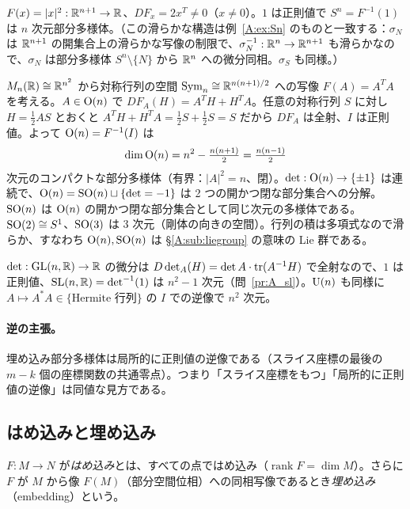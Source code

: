 \begin{ex}[球面]
$F(x)=|x|^2:\mathbb R^{n+1}\to\mathbb R$、$DF_x=2x^T\ne0$（$x\ne0$）。$1$ は正則値で $S^n=F^{-1}(1)$ は $n$ 次元部分多様体。（この滑らかな構造は例~\ref{A:ex:Sn} のものと一致する：$\sigma_N$ は $\mathbb R^{n+1}$ の開集合上の滑らかな写像の制限で、$\sigma_N^{-1}:\mathbb R^n\to\mathbb R^{n+1}$ も滑らかなので、$\sigma_N$ は部分多様体 $S^n\setminus\{N\}$ から $\mathbb R^n$ への微分同相。$\sigma_S$ も同様。）
\end{ex}

\begin{ex}[$\OO(n)$、$\SO(n)$]\label{A:ex:SOn}
$M_n(\mathbb R)\cong\mathbb R^{n^2}$ から対称行列の空間 $\mathrm{Sym}_n\cong\mathbb R^{n(n+1)/2}$ への写像 $F(A)=A^TA$ を考える。$A\in\mathrm{O}(n)$ で $DF_A(H)=A^TH+H^TA$。任意の対称行列 $S$ に対し $H=\frac12AS$ とおくと $A^TH+H^TA=\frac12S+\frac12S=S$ だから $DF_A$ は全射、$I$ は正則値。よって $\mathrm{O}(n)=F^{-1}(I)$ は
\[
\dim\mathrm{O}(n)=n^2-\tfrac{n(n+1)}2=\tfrac{n(n-1)}2
\]
次元のコンパクトな部分多様体（有界：$|A|^2=n$、閉）。$\det:\mathrm{O}(n)\to\{\pm1\}$ は連続で、$\mathrm{O}(n)=\mathrm{SO}(n)\sqcup\{\det=-1\}$ は 2 つの開かつ閉な部分集合への分解。$\SO(n)$ は $\OO(n)$ の開かつ閉な部分集合として同じ次元の多様体である。$\mathrm{SO}(2)\cong S^1$、$\mathrm{SO}(3)$ は 3 次元（剛体の向きの空間）。行列の積は多項式なので滑らか、すなわち $\mathrm{O}(n),\mathrm{SO}(n)$ は §\ref{A:sub:liegroup} の意味の Lie 群である。
\end{ex}

\begin{ex}[$\SL(n,\R)$ ほか]
$\det:\mathrm{GL}(n,\mathbb R)\to\mathbb R$ の微分は $D\det_A(H)=\det A\cdot\operatorname{tr}(A^{-1}H)$ で全射なので、$1$ は正則値、$\mathrm{SL}(n,\mathbb R)=\det^{-1}(1)$ は $n^2-1$ 次元（問~\ref{pr:A_sl}）。$\mathrm{U}(n)$ も同様に $A\mapsto A^*A\in\{\text{Hermite 行列}\}$ の $I$ での逆像で $n^2$ 次元。
\end{ex}

\paragraph{逆の主張。}埋め込み部分多様体は局所的に正則値の逆像である（スライス座標の最後の $m-k$ 個の座標関数の共通零点）。つまり「スライス座標をもつ」「局所的に正則値の逆像」は同値な見方である。

\subsection{はめ込みと埋め込み}
\begin{defn}
$F:M\to N$ が\emph{はめ込み}とは、すべての点ではめ込み（$\operatorname{rank}F=\dim M$）。さらに $F$ が $M$ から像 $F(M)$（部分空間位相）への同相写像であるとき\emph{埋め込み}（embedding）という。
\end{defn}

